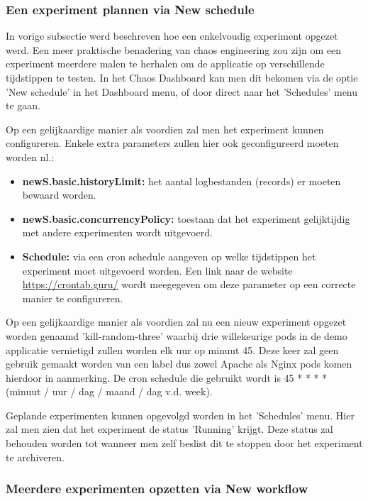 \subsubsection{Een experiment plannen via New schedule}

In vorige subsectie werd beschreven hoe een enkelvoudig experiment opgezet werd. Een meer praktische benadering van chaos engineering zou zijn om een experiment meerdere malen te herhalen om de applicatie op verschillende tijdstippen te testen. In het Chaos Dashboard kan men dit bekomen via de optie 'New schedule' in het Dashboard menu, of door direct naar het 'Schedules' menu te gaan. 

Op een gelijkaardige manier als voordien zal men het experiment kunnen configureren. Enkele extra parameters zullen hier ook geconfigureerd moeten worden nl.:
\begin{itemize}
    \item {\bf newS.basic.historyLimit:} het aantal logbestanden (records) er moeten bewaard worden.
    \item {\bf newS.basic.concurrencyPolicy:} toestaan dat het experiment gelijktijdig met andere experimenten wordt uitgevoerd.
    \item {\bf Schedule:} via een cron schedule aangeven op welke tijdstippen het experiment moet uitgevoerd worden. Een link naar de website \url{https://crontab.guru/} wordt meegegeven om deze parameter op een correcte manier te configureren.
\end{itemize}

Op een gelijkaardige manier als voordien zal nu een nieuw experiment opgezet worden genaamd 'kill-random-three' waarbij drie willekeurige pods in de demo applicatie vernietigd zullen worden elk uur op minuut 45. Deze keer zal geen gebruik gemaakt worden van een label dus zowel Apache als Nginx pods komen hierdoor in aanmerking.
De cron schedule die gebruikt wordt is 45 * * * *  (minuut / uur / dag / maand / dag v.d. week).

Geplande experimenten kunnen opgevolgd worden in het 'Schedules' menu. Hier zal men zien dat het experiment de status 'Running' krijgt. Deze status zal behouden worden tot wanneer men zelf beslist dit te stoppen door het experiment te archiveren. 

\subsubsection{Meerdere experimenten opzetten via New workflow}

